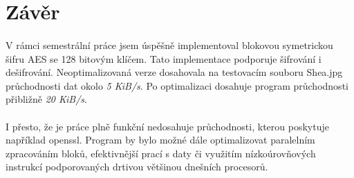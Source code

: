 \documentclass[12pt, a4paper]{article}
\begin{document}
\newpage
\section{Závěr}
\paragraph{}
V rámci semestrální práce jsem úspěšně implementoval blokovou symetrickou šifru AES se 128 bitovým klíčem.
Tato implementace podporuje šifrování i dešifrování. Neoptimalizovaná verze dosahovala na testovacím souboru Shea.jpg
průchodnosti dat okolo \textit{5 KiB/s}. Po optimalizaci dosahuje program průchodnosti přibližně \textit{20 KiB/s}.
\paragraph{}
I přesto, že je práce plně funkční nedosahuje průchodnosti, kterou poskytuje například openssl. Program by bylo možné
dále optimalizovat paralelním zpracováním bloků, efektivnější prací s daty či využitím nízkoúrovňových instrukcí podporovaných
drtivou většinou dnešních procesorů.

\newpage
\renewcommand{\listfigurename}{Seznam rovnic}
\listoffigures
\newpage
\listoftables
\end{document}
